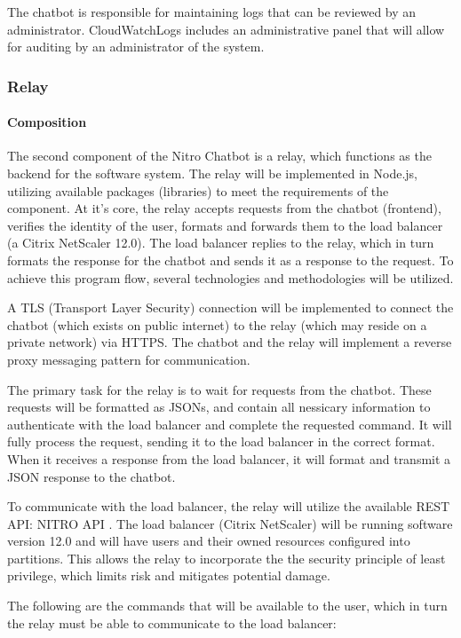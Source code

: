 The chatbot is responsible for maintaining logs that can be reviewed by an administrator.
CloudWatchLogs includes an administrative panel that will allow for auditing by an administrator of the system.

\subsubsection{Relay}
\paragraph{Composition}
The second component of the Nitro Chatbot is a relay, which functions as the backend for the software system.
The relay will be implemented in Node.js, utilizing available packages (libraries) to meet the requirements of the component.
At it's core, the relay accepts requests from the chatbot (frontend), verifies the identity of the user, formats and forwards them to the load balancer (a Citrix NetScaler 12.0).
The load balancer replies to the relay, which in turn formats the response for the chatbot and sends it as a response to the request.
To achieve this program flow, several technologies and methodologies will be utilized.

A TLS (Transport Layer Security) connection will be implemented to connect the chatbot (which exists on public internet) to the relay (which may reside on a private network) via HTTPS.
The chatbot and the relay will implement a reverse proxy messaging pattern for communication.

The primary task for the relay is to wait for requests from the chatbot.
These requests will be formatted as JSONs, and contain all nessicary information to authenticate with the load balancer and complete the requested command.
It will fully process the request, sending it to the load balancer in the correct format.
When it receives a response from the load balancer, it will format and transmit a JSON response to the chatbot.

To communicate with the load balancer, the relay will utilize the available REST API: NITRO API \cite{nitro}.
The load balancer (Citrix NetScaler) will be running software version 12.0 and will have users and their owned resources configured into partitions.
This allows the relay to incorporate the the security principle of least privilege, which limits risk and mitigates potential damage.

The following are the commands that will be available to the user, which in turn the relay must be able to communicate to the load balancer:

